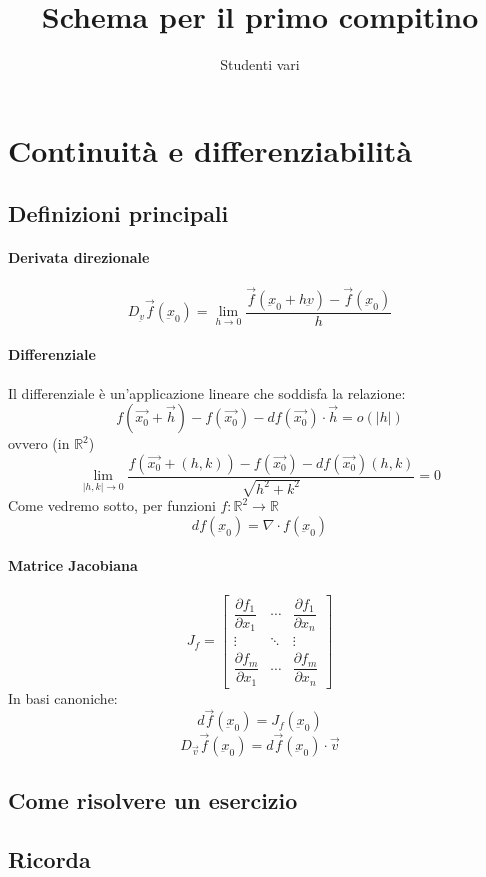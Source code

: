 \documentclass[a4paper,10pt]{book}
\author{Studenti vari}
\title{Schema per il primo compitino}
\begin{document}
\maketitle

\section{Continuità e differenziabilità}
\subsection{Definizioni principali}
\paragraph{Derivata direzionale}
$$D_{\underbar{v}} \vec{f}(\underbar{x}_0) = \lim_{h \to 0}{\dfrac{\vec{f}(\underbar{x}_0+h\underbar{v})-\vec{f}(\underbar{x}_0)}{h}}$$
\paragraph{Differenziale}
Il differenziale è un'applicazione lineare che soddisfa la relazione:
$$f(\vec{x_0}+\vec{h}) - f(\vec{x_0}) - df(\vec{x_0})\cdot\vec{h} = o(|h|)$$
ovvero (in $\mathbb{R}^2$)
$$ \lim_{|h, k| \to 0} \dfrac{f(\vec{x_0}+(h, k)) - f(\vec{x_0}) - df(\vec{x_0})(h, k)}{\sqrt{h^2+k^2}} = 0 $$
Come vedremo sotto, per funzioni $f: \mathbb{R}^2 \rightarrow \mathbb{R}$
$$df(\underbar{x}_0) = \nabla \cdot f(\underbar{x}_0)$$
\paragraph{Matrice Jacobiana}
$$J_f = \begin{bmatrix} \dfrac{\partial f_1}{\partial x_1} & \cdots & \dfrac{\partial f_1}{\partial x_n} \\ \vdots & \ddots & \vdots \\ \dfrac{\partial f_m}{\partial x_1} & \cdots & \dfrac{\partial f_m}{\partial x_n}  \end{bmatrix}$$
In basi canoniche:
$$ d\vec{f}(\underbar{x}_0)= J_f(\underbar{x}_0) $$
$$D_{\vec{v}} \vec{f}(\underbar{x}_0) = d\vec{f}(\underbar{x}_0)\cdot\vec{v}$$
\subsection{Come risolvere un esercizio}

\subsection{Ricorda}
\end{document}
